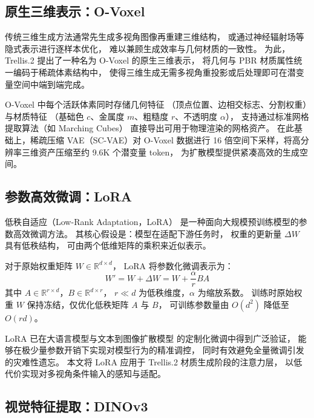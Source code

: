 \subsection{原生三维表示：O-Voxel}

传统三维生成方法通常先生成多视角图像再重建三维结构，
或通过神经辐射场等隐式表示进行逐样本优化，
难以兼顾生成效率与几何材质的一致性。
为此，Trellis.2\cite{xiang2025native} 提出了一种名为 O-Voxel 的原生三维表示，
将几何与 PBR 材质属性统一编码于稀疏体素结构中，
使得三维生成无需多视角重投影或后处理即可在潜变量空间中端到端完成。

O-Voxel 中每个活跃体素同时存储几何特征
（顶点位置、边相交标志、分割权重）与材质特征
（基础色 $c$、金属度 $m$、粗糙度 $r$、不透明度 $\alpha$），
支持通过标准网格提取算法（如 Marching Cubes）
直接导出可用于物理渲染的网格资产。
在此基础上，稀疏压缩 VAE（SC-VAE）对 O-Voxel 数据进行
16 倍空间下采样，将高分辨率三维资产压缩至约 9.6K 个潜变量 token，
为扩散模型提供紧凑高效的生成空间。

\subsection{参数高效微调：LoRA}

低秩自适应（Low-Rank Adaptation，LoRA）\cite{hu2022lora}
是一种面向大规模预训练模型的参数高效微调方法。
其核心假设是：模型在适配下游任务时，
权重的更新量 $\Delta W$ 具有低秩结构，
可由两个低维矩阵的乘积来近似表示。

对于原始权重矩阵 $W \in \mathbb{R}^{d \times d}$，
LoRA 将参数化微调表示为：
\begin{equation}
    W' = W + \Delta W = W + \frac{\alpha}{r} BA
\end{equation}
其中 $A \in \mathbb{R}^{r \times d}$，$B \in \mathbb{R}^{d \times r}$，
$r \ll d$ 为低秩维度，$\alpha$ 为缩放系数。
训练时原始权重 $W$ 保持冻结，仅优化低秩矩阵 $A$ 与 $B$，
可训练参数量由 $O(d^2)$ 降低至 $O(rd)$。

LoRA 已在大语言模型\cite{hu2022lora}与文本到图像扩散模型\cite{ruiz2023dreambooth}
的定制化微调中得到广泛验证，
能够在极少量参数开销下实现对模型行为的精准调控，
同时有效避免全量微调引发的灾难性遗忘\cite{kirkpatrick2017overcoming}。
本文将 LoRA 应用于 Trellis.2 材质生成阶段的注意力层，
以低代价实现对多视角条件输入的感知与适配。

\subsection{视觉特征提取：DINOv3}

